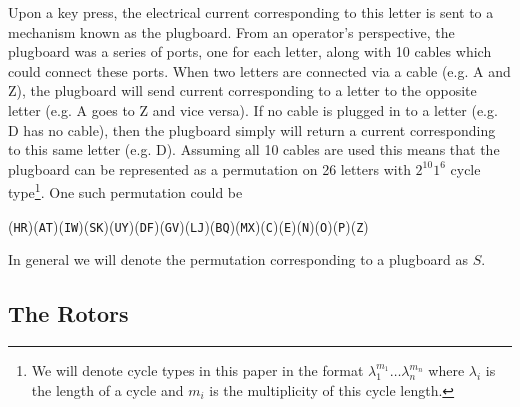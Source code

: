 
Upon a key press, the electrical current corresponding to this letter
is sent to a mechanism known as the plugboard. From an operator's
perspective, the plugboard was a series of ports, one for each
letter, along with 10 cables which could connect these ports. When
two letters are connected via a cable (e.g. A and Z), the plugboard
will send current corresponding to a letter to the opposite letter
(e.g. A goes to Z and vice versa). If no cable is plugged in to a
letter (e.g. D has no cable), then the plugboard simply will return a
current corresponding to this same letter (e.g. D). Assuming all 10
cables are used this means that the plugboard can be represented as a
permutation on 26 letters with $2^{10}1^6$ cycle type\footnote{We
	will denote cycle types in this paper in the format
	$\lambda_1^{m_1}\dots\lambda_n^{m_n}$ where $\lambda_i$ is the length
	of a cycle and $m_i$ is the multiplicity of this cycle length.}. One such
permutation could be
\begin{center}
	(\texttt{HR})(\texttt{AT})(\texttt{IW})(\texttt{SK})(\texttt{UY})(\texttt{DF})(\texttt{GV})(\texttt{LJ})(\texttt{BQ})(\texttt{MX})(\texttt{C})(\texttt{E})(\texttt{N})(\texttt{O})(\texttt{P})(\texttt{Z})
\end{center}
In general we will denote the permutation corresponding to a plugboard as $S$.

\subsection{The Rotors}

